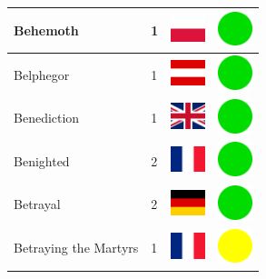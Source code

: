 \documentclass[12pt, a4paper, twoside]{report}
\begin{document}
\begin{center}
\begin{longtable}{|p{5cm}|p{2cm}|p{2cm}|p{2cm}|}
			Behemoth & 1 & \includegraphics[width=1cm]{4x3/pl} & \includegraphics[width=1cm]{likes/y} \\ \hline
			Belphegor & 1 & \includegraphics[width=1cm]{4x3/at} & \includegraphics[width=1cm]{likes/y} \\ \hline
			Benediction & 1 & \includegraphics[width=1cm]{4x3/gb} & \includegraphics[width=1cm]{likes/y} \\ \hline
			Benighted & 2 & \includegraphics[width=1cm]{4x3/fr} & \includegraphics[width=1cm]{likes/y} \\ \hline
			Betrayal & 2 & \includegraphics[width=1cm]{4x3/de} & \includegraphics[width=1cm]{likes/y} \\ \hline
			Betraying the Martyrs & 1 & \includegraphics[width=1cm]{4x3/fr} & \includegraphics[width=1cm]{likes/m} \\ \hline

\end{longtable}
\end{center}
\end{document}
